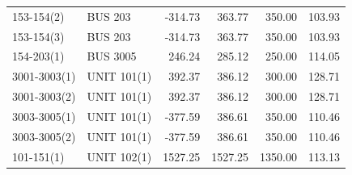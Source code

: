 \documentclass[10pt]{report}
\begin{document}
\begin{table}[H]
{\begin{tabular}{llrrrr}
153-154(2) & BUS 203 & -314.73 & 363.77 & 350.00 & 103.93 \\
153-154(3) & BUS 203 & -314.73 & 363.77 & 350.00 & 103.93 \\
154-203(1) & BUS 3005 & 246.24 & 285.12 & 250.00 & 114.05 \\
3001-3003(1) & UNIT 101(1) & 392.37 & 386.12 & 300.00 & 128.71 \\
3001-3003(2) & UNIT 101(1) & 392.37 & 386.12 & 300.00 & 128.71 \\
3003-3005(1) & UNIT 101(1) & -377.59 & 386.61 & 350.00 & 110.46 \\
3003-3005(2) & UNIT 101(1) & -377.59 & 386.61 & 350.00 & 110.46 \\
101-151(1) & UNIT 102(1) & 1527.25 & 1527.25 & 1350.00 & 113.13 \\
\bottomrule
\end{tabular}}
\end{table}
\end{document}
